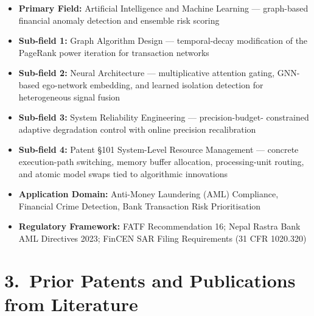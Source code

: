 \documentclass[12pt,a4paper]{article}
\begin{document}
\begin{itemize}[leftmargin=*,noitemsep]
  \item \textbf{Primary Field:} Artificial Intelligence and Machine Learning ---
        graph-based financial anomaly detection and ensemble risk scoring
  \item \textbf{Sub-field 1:} Graph Algorithm Design --- temporal-decay modification
        of the PageRank power iteration for transaction networks
  \item \textbf{Sub-field 2:} Neural Architecture --- multiplicative attention gating,
        GNN-based ego-network embedding, and learned isolation detection for
        heterogeneous signal fusion
  \item \textbf{Sub-field 3:} System Reliability Engineering --- precision-budget-
        constrained adaptive degradation control with online precision recalibration
  \item \textbf{Sub-field 4:} Patent \S101 System-Level Resource Management ---
        concrete execution-path switching, memory buffer allocation, processing-unit
        routing, and atomic model swaps tied to algorithmic innovations
  \item \textbf{Application Domain:} Anti-Money Laundering (AML) Compliance,
        Financial Crime Detection, Bank Transaction Risk Prioritisation
  \item \textbf{Regulatory Framework:} FATF Recommendation 16; Nepal Rastra Bank
        AML Directives 2023; FinCEN SAR Filing Requirements (31 CFR 1020.320)
\end{itemize}

\section{3.\ Prior Patents and Publications from Literature}
\end{document}
